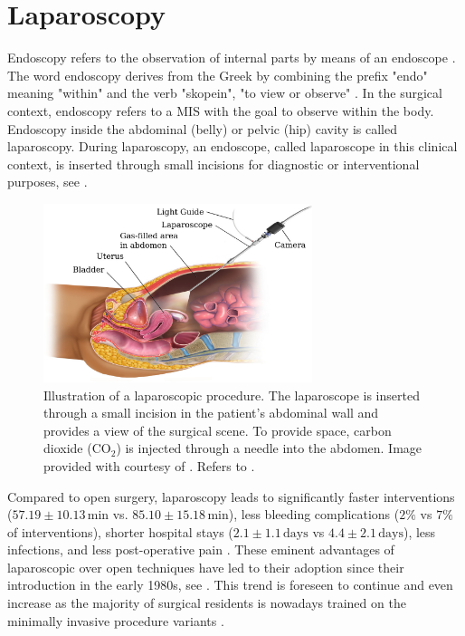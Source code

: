\section{Laparoscopy}
\label{in:sec:laparoscopy}
Endoscopy refers to the observation of internal parts by means of an endoscope \cite{oedendoscopy}. The word endoscopy derives from the Greek by combining the prefix "endo" meaning "within" and the verb "skopein", "to view or observe" \cite{majumdar1993short}. In the surgical context, endoscopy refers to a MIS with the goal to observe within the body. Endoscopy inside the abdominal (belly) or pelvic (hip) cavity is called laparoscopy. During laparoscopy, an endoscope, called laparoscope in this clinical context, is inserted through small incisions for diagnostic or interventional purposes, see .
\begin{figure}[tb]
    \centering
    \includegraphics[width=0.7\textwidth]{introduction/img/laparoscopy.jpg}
    \caption{Illustration of a laparoscopic procedure. The laparoscope is inserted through a small incision in the patient's abdominal wall and provides a view of the surgical scene. To provide space, carbon dioxide ($\text{CO}_2$) is injected through a needle into the abdomen. Image provided with courtesy of \cite{blausen2014laparoscopy}. Refers to .}
    \label{in:fig:laparoscopy}
\end{figure}

Compared to open surgery, laparoscopy leads to significantly faster interventions ($57.19\pm10.13\,\text{min}$ vs. $85.10\pm15.18\,\text{min}$), less bleeding complications ($2\%$ vs $7\%$ of interventions), shorter hospital stays ($2.1\pm1.1\,\text{days}$ vs $4.4\pm2.1\,\text{days}$), less infections, and less post-operative pain \cite{shi2023laparoscopic}. These eminent advantages of laparoscopic over open techniques have led to their adoption since their introduction in the early 1980s, see . This trend is foreseen to continue and even increase as the majority of surgical residents is nowadays trained on the minimally invasive procedure variants \cite{john2020rise}.

